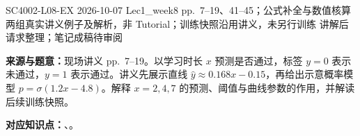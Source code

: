 

\examplemeta
  {SC4002-L08-EX}
  {2026-10-07}
  {Lec1\_week8 pp.~7--19、41--45；公式补全与数值核算}
  {两组真实讲义例子及解析，非 Tutorial；训练快照沿用讲义，未另行训练}
  {讲解后请求整理；笔记成稿待审阅}


\textbf{来源与题意：}现场讲义 pp.~7--19。以学习时长 $x$ 预测是否通过，标签 $y=0$ 表示未通过，$y=1$ 表示通过。讲义先展示直线 $\hat y\approx0.168x-0.15$，再给出示意概率模型 $p=\sigma(1.2x-4.8)$。解释 $x=2,4,7$ 的预测、阈值与曲线参数的作用，并解读后续训练快照。

\textbf{对应知识点：}、。

